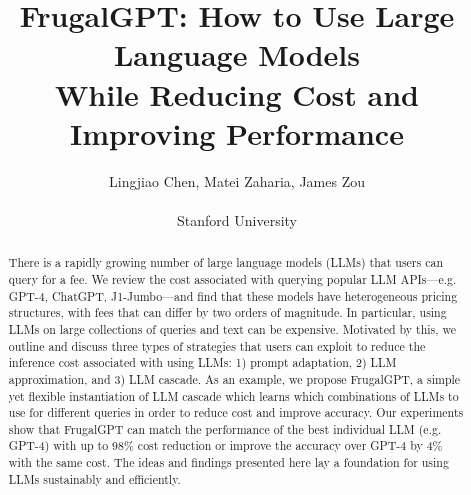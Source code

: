 \documentclass{article}
\title{FrugalGPT: How to Use Large Language Models  \\While Reducing Cost and Improving Performance}
\author{Lingjiao Chen, Matei Zaharia, James Zou\\\\
Stanford University}
\date{}
\numberwithin{equation}{section}
\newcommand{\systemFGPT}{{FrugalGPT}}
\begin{document}
\maketitle

\begin{abstract}
There is a rapidly growing number of large language models (LLMs) that users can query for a fee. We review the cost associated with querying popular LLM APIs---e.g. GPT-4, ChatGPT, J1-Jumbo---and find that these models have heterogeneous pricing structures, with fees that can differ by two orders of magnitude. In particular, using LLMs on large collections of queries and text can be expensive. Motivated by this, we outline and discuss  three types of strategies that users can exploit to reduce the inference cost associated with using LLMs: 1) prompt adaptation, 2) LLM approximation, and 3) LLM cascade. As an example, we propose \systemFGPT{}, a simple yet flexible instantiation of LLM cascade which learns which combinations of LLMs to use for different queries in order to reduce cost and improve accuracy. Our experiments show that \systemFGPT{} can match the performance of the best individual LLM (e.g. GPT-4) with up to 98\% cost reduction or improve the accuracy over GPT-4 by 4\% with the same cost. The ideas and findings presented here lay a foundation for using LLMs sustainably and efficiently.     

\end{abstract}
\end{document}
